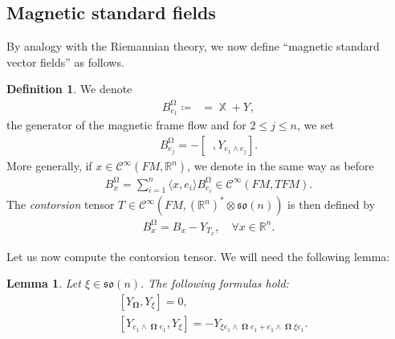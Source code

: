 \documentclass[12pt]{amsart}
\numberwithin{numbering}{section}
\theoremstyle{plain}
\newtheorem{lem}[numbering]{Lemma}
\theoremstyle{definition}
\newtheorem{df}[numbering]{Definition}
\theoremstyle{remark}
\numberwithin{equation}{section}
\DeclareMathOperator{\xx}{\mathbb{X}}
\DeclareMathOperator{\xs}{\mathbb{X}^{\mg}}
\DeclareMathOperator{\oo}{\mathbf{\Omega}}
\DeclareMathOperator{\ot}{\widetilde{\mathbf{\Omega}}}
\DeclareMathOperator{\mg}{\Omega}
\newcommand{\con}[1]{T_{#1}}
\newcommand{\R}{\mathbb{R}}
\newcommand{\frk}[1]{\mathfrak{#1}}
\begin{document}
\subsection{Magnetic standard fields} \label{sec:mag_std_fields}

By analogy with the Riemannian theory, we now define “magnetic standard vector fields” as follows.
\begin{df} \label{def:mag_std}
We denote 
\begin{align*}
B^{\mg}_{e_1} \coloneq \xs = \xx + Y_{\ot},
\end{align*}
the generator of the magnetic frame flow and for $2 \leq j \leq n$, we set 
\begin{align}
B_{e_j}^{\mg} = - [\xs, Y_{e_1 \wedge e_j}].
\end{align}
More generally, if $x \in \mathcal{C}^\infty(FM, \R^n)$, we denote in the same way as before 
\begin{align*}
B_x^{\mg} = \sum_{i=1}^n \langle x, e_i \rangle B_{e_i}^{\mg} \in \mathcal{C}^\infty(FM, TFM).
\end{align*}
The \emph{contorsion} tensor $\con{} \in \mathcal{C}^\infty(FM, (\R^n)^* \otimes \frk{so}(n))$ is then defined by 
\begin{align}
B_{x}^{\mg} = B_x - Y_{\con{x}}, \quad \forall x \in \R^n.
\end{align}
\end{df}

Let us now compute the contorsion tensor. We will need the following lemma:
\begin{lem} \label{lem:commutation_rel}
Let $\xi \in \frk{so}(n)$. The following formulas hold:
\begin{align}
&[Y_{\oo}, Y_\xi] = 0, \label{eq:comm1}\\
&[Y_{e_1 \wedge \oo e_1}, Y_\xi] = - Y_{\xi e_1 \wedge \oo e_1 + e_1 \wedge \oo \xi e_1}. \label{eq:comm2}
\end{align}
\end{lem}
\end{document}
